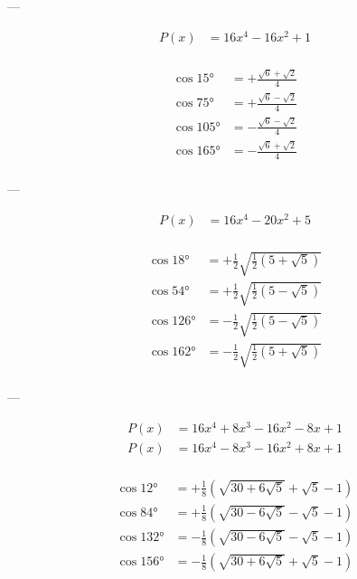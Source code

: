 ---

$$
\begin{aligned}
    P(x) &= 16 x^4-16 x^2+1\\
\end{aligned}
$$

$$
\begin{aligned}
    \cos 15°  &= +\frac{\sqrt{6}+\sqrt{2}}{4}\\
    \cos 75°  &= +\frac{\sqrt{6}-\sqrt{2}}{4}\\
    \cos 105° &= -\frac{\sqrt{6}-\sqrt{2}}{4}\\
    \cos 165° &= -\frac{\sqrt{6}+\sqrt{2}}{4}\\
\end{aligned}
$$

---

$$
\begin{aligned}
    P(x) &= 16 x^4-20 x^2+5\\
\end{aligned}
$$

$$
\begin{aligned}
    \cos 18°  &= +\frac{1}{2} \sqrt{\frac{1}{2} \left(5+\sqrt{5}\right)}\\
    \cos 54°  &= +\frac{1}{2} \sqrt{\frac{1}{2} \left(5-\sqrt{5}\right)}\\
    \cos 126° &= -\frac{1}{2} \sqrt{\frac{1}{2} \left(5-\sqrt{5}\right)}\\
    \cos 162° &= -\frac{1}{2} \sqrt{\frac{1}{2} \left(5+\sqrt{5}\right)}\\
\end{aligned}
$$

---

$$
\begin{aligned}
    P(x) &= 16 x^4+8 x^3-16 x^2-8 x+1\\
    P(x) &= 16 x^4-8 x^3-16 x^2+8 x+1\\
\end{aligned}
$$

$$
\begin{aligned}
    \cos 12°  &= +\frac{1}{8} \left(\sqrt{30+6\sqrt{5}}+\sqrt{5}-1\right)\\
    \cos 84°  &= +\frac{1}{8} \left(\sqrt{30-6\sqrt{5}}-\sqrt{5}-1\right)\\
    \cos 132° &= -\frac{1}{8} \left(\sqrt{30-6\sqrt{5}}-\sqrt{5}-1\right)\\
    \cos 156° &= -\frac{1}{8} \left(\sqrt{30+6\sqrt{5}}+\sqrt{5}-1\right)\\
\end{aligned}
$$


